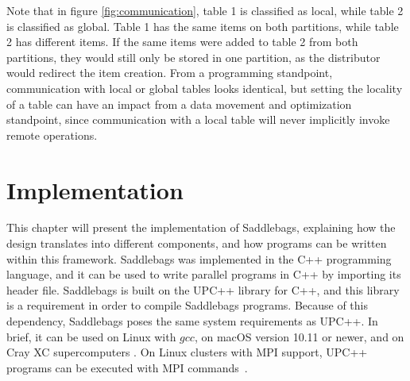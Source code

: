 \documentclass{uit-report}
\begin{document}
Note that in figure \ref{fig:communication}, table 1 is classified as local, while table 2 is classified as global. Table 1 has the same items on both partitions, while table 2 has different items. If the same items were added to table 2 from both partitions, they would still only be stored in one partition, as the distributor would redirect the item creation. From a programming standpoint, communication with local or global tables looks identical, but setting the locality of a table can have an impact from a data movement and optimization standpoint, since communication with a local table will never implicitly invoke remote operations.








\newpage
\chapter{Implementation}
This chapter will present the implementation of Saddlebags, explaining how the design translates into different components, and how programs can be written within this framework. Saddlebags was implemented in the C++ programming language, and it can be used to write parallel programs in C++ by importing its header file. Saddlebags is built on the UPC++ library for C++, and this library is a requirement in order to compile Saddlebags programs. Because of this dependency, Saddlebags poses the same system requirements as UPC++. In brief, it can be used on Linux with $gcc$, on macOS version 10.11 or newer, and on Cray XC supercomputers \cite{upcreq}. On Linux clusters with MPI support, UPC++ programs can be executed with MPI commands~\cite{upcmpi}.
\end{document}
